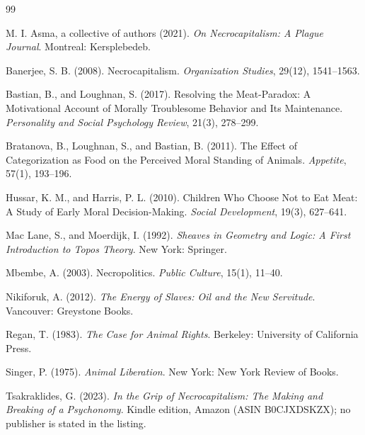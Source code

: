 \documentclass[11pt]{article}
\theoremstyle{definition}
\theoremstyle{plain}
\theoremstyle{definition}
\begin{document}
\begingroup\small
\setlength{\itemsep}{2pt}
\begin{thebibliography}{99}

M. I. Asma, a collective of authors (2021).
\newblock \emph{On Necrocapitalism: A Plague Journal}.
\newblock Montreal: Kersplebedeb.

Banerjee, S. B. (2008).
\newblock Necrocapitalism.
\newblock \emph{Organization Studies}, 29(12), 1541--1563.

Bastian, B., and Loughnan, S. (2017).
\newblock Resolving the Meat-Paradox: A Motivational Account of Morally Troublesome Behavior and Its Maintenance.
\newblock \emph{Personality and Social Psychology Review}, 21(3), 278--299.

Bratanova, B., Loughnan, S., and Bastian, B. (2011).
\newblock The Effect of Categorization as Food on the Perceived Moral Standing of Animals.
\newblock \emph{Appetite}, 57(1), 193--196.

Hussar, K. M., and Harris, P. L. (2010).
\newblock Children Who Choose Not to Eat Meat: A Study of Early Moral Decision-Making.
\newblock \emph{Social Development}, 19(3), 627--641.

Mac Lane, S., and Moerdijk, I. (1992).
\newblock \emph{Sheaves in Geometry and Logic: A First Introduction to Topos Theory}.
\newblock New York: Springer.

Mbembe, A. (2003).
\newblock Necropolitics.
\newblock \emph{Public Culture}, 15(1), 11--40.

Nikiforuk, A. (2012).
\newblock \emph{The Energy of Slaves: Oil and the New Servitude}.
\newblock Vancouver: Greystone Books.

Regan, T. (1983).
\newblock \emph{The Case for Animal Rights}.
\newblock Berkeley: University of California Press.

Singer, P. (1975).
\newblock \emph{Animal Liberation}.
\newblock New York: New York Review of Books.

Tsakraklides, G. (2023).
\newblock \emph{In the Grip of Necrocapitalism: The Making and Breaking of a Psychonomy}.
\newblock Kindle edition, Amazon (ASIN B0CJXDSKZX); no publisher is stated in the listing.

\end{thebibliography}
\endgroup
\end{document}

